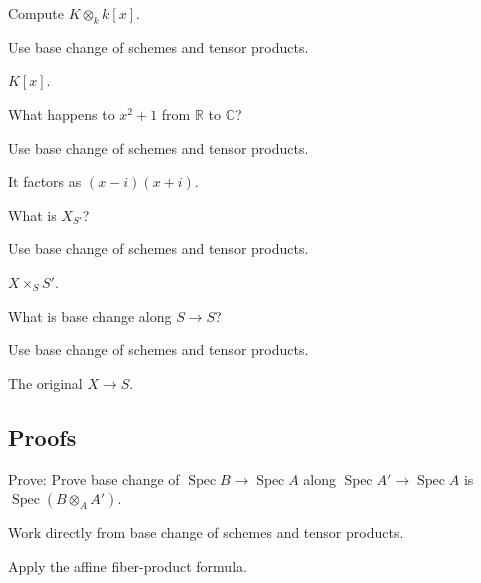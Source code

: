 \begin{exercise}[Polynomial]\label{exr:vi24-expand-02}
Compute $K\otimes_k k[x]$.
\end{exercise}
\begin{hint}
Use base change of schemes and tensor products.
\end{hint}
\begin{solution}
$K[x]$.
\end{solution}

\begin{exercise}[Quadratic]\label{exr:vi24-expand-03}
What happens to $x^2+1$ from $\mathbb R$ to $\mathbb C$?
\end{exercise}
\begin{hint}
Use base change of schemes and tensor products.
\end{hint}
\begin{solution}
It factors as $(x-i)(x+i)$.
\end{solution}

\begin{exercise}[Notation]\label{exr:vi24-expand-04}
What is $X_{S'}$?
\end{exercise}
\begin{hint}
Use base change of schemes and tensor products.
\end{hint}
\begin{solution}
$X\times_S S'$.
\end{solution}

\begin{exercise}[Identity]\label{exr:vi24-expand-05}
What is base change along $S\to S$?
\end{exercise}
\begin{hint}
Use base change of schemes and tensor products.
\end{hint}
\begin{solution}
The original $X\to S$.
\end{solution}

\subsection*{Proofs}

\begin{exercise}\label{exr:vi24-expand-06}
Prove: Prove base change of $\operatorname{Spec}B\to\operatorname{Spec}A$ along $\operatorname{Spec}A'\to\operatorname{Spec}A$ is $\operatorname{Spec}(B\otimes_AA')$.
\end{exercise}
\begin{hint}
Work directly from base change of schemes and tensor products.
\end{hint}
\begin{solution}
Apply the affine fiber-product formula.
\end{solution}


